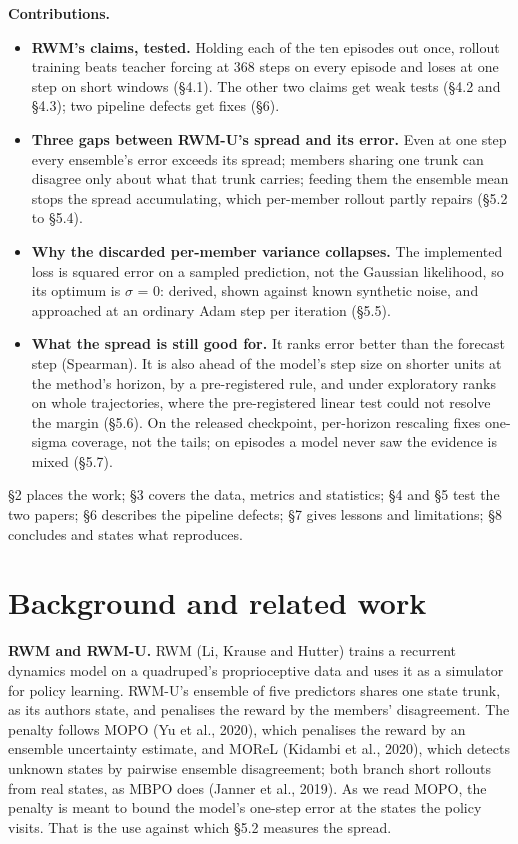 \documentclass[10pt]{article}
\begin{document}
\textbf{Contributions.}

\begin{itemize}
\item \textbf{RWM's claims, tested.} Holding each of the ten episodes out once, rollout training beats teacher forcing at 368 steps on every episode and loses at one step on short windows (\S{}4.1). The other two claims get weak tests (\S{}4.2 and \S{}4.3); two pipeline defects get fixes (\S{}6).
\item \textbf{Three gaps between RWM-U's spread and its error.} Even at one step every ensemble's error exceeds its spread; members sharing one trunk can disagree only about what that trunk carries; feeding them the ensemble mean stops the spread accumulating, which per-member rollout partly repairs (\S{}5.2 to \S{}5.4).
\item \textbf{Why the discarded per-member variance collapses.} The implemented loss is squared error on a sampled prediction, not the Gaussian likelihood, so its optimum is $\sigma$ = 0: derived, shown against known synthetic noise, and approached at an ordinary Adam step per iteration (\S{}5.5).
\item \textbf{What the spread is still good for.} It ranks error better than the forecast step (Spearman). It is also ahead of the model's step size on shorter units at the method's horizon, by a pre-registered rule, and under exploratory ranks on whole trajectories, where the pre-registered linear test could not resolve the margin (\S{}5.6). On the released checkpoint, per-horizon rescaling fixes one-sigma coverage, not the tails; on episodes a model never saw the evidence is mixed (\S{}5.7).
\end{itemize}

\S{}2 places the work; \S{}3 covers the data, metrics and statistics; \S{}4 and \S{}5 test the two papers; \S{}6 describes the pipeline defects; \S{}7 gives lessons and limitations; \S{}8 concludes and states what reproduces.


\section{Background and related work}

\textbf{RWM and RWM-U.} RWM (Li, Krause and Hutter) trains a recurrent dynamics model on a quadruped's proprioceptive data and uses it as a simulator for policy learning. RWM-U's ensemble of five predictors shares one state trunk, as its authors state, and penalises the reward by the members' disagreement. The penalty follows MOPO (Yu et al., 2020), which penalises the reward by an ensemble uncertainty estimate, and MOReL (Kidambi et al., 2020), which detects unknown states by pairwise ensemble disagreement; both branch short rollouts from real states, as MBPO does (Janner et al., 2019). As we read MOPO, the penalty is meant to bound the model's one-step error at the states the policy visits. That is the use against which \S{}5.2 measures the spread.
\end{document}
